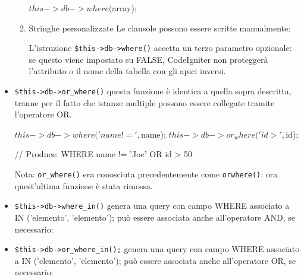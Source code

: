 \begin{itemize}
\begin{enumerate}
\begin{code}
$this->db->where($array);
\end{code}

\item Stringhe personalizzate
Le clausole possono essere scritte manualmente:


L'istruzione \verb|$this->db->where()| accetta un terzo parametro opzionale: se questo viene impostato su FALSE, CodeIgniter non proteggerà l'attributo o il nome della tabella con gli apici inversi.

\end{enumerate}

\item \verb|$this->db->or_where()| questa funzione è identica a quella sopra descritta, tranne per il fatto che istanze multiple possono essere collegate tramite l'operatore OR.

\begin{code}
$this->db->where('name !=', $name);
$this->db->or_where('id >', $id); 

// Produce: WHERE name != 'Joe' OR id > 50
\end{code}

Nota: \verb|or_where()| era conosciuta precedentemente come \verb|orwhere()|: ora quest'ultima funzione è stata rimossa.

\item \verb|$this->db->where_in()| genera una query con campo WHERE associato a IN ('elemento', 'elemento'); può essere associata anche all'operatore AND, se necessario:


\item \verb|$this->db->or_where_in();| genera una query con campo WHERE associato a IN ('elemento', 'elemento'); può essere associata anche all'operatore OR, se necessario:



\end{itemize}
